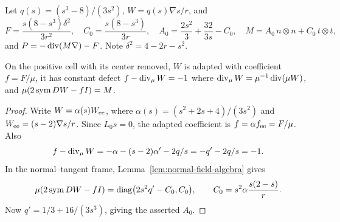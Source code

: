 \begin{definition}
\label{def:dd-virial-field}
\leanok
Let $q(s)=(s^3-8)/(3s^2)$, $W=q(s)\nabla s/r$, and
\[
  F=\frac{s(8-s^3)\delta^2}{3r^2},\quad
  C_0=\frac{s(8-s^3)}{3r},\quad
  A_0=\frac{2s^2}3+\frac{32}{3s}-C_0,\quad
  M=A_0\,n\otimes n+C_0\,t\otimes t,
\]
and $P=-\operatorname{div}(M\nabla)-F$. Note $\delta^2=4-2r-s^2$.
\end{definition}

\begin{lemma}
\label{lem:dd-virial-algebra}
\leanok
On the positive cell with its center removed, $W$ is adapted with coefficient $f=F/\mu$, it has constant defect
$f-\operatorname{div}_\mu W=-1$ where $\operatorname{div}_\mu W=\mu^{-1}\operatorname{div}(\mu W)$, and
$\mu(2\operatorname{sym} DW-fI)=M$.
\end{lemma}

\begin{proof}
\leanok
Write $W=\alpha(s)W_{\rm ee}$, where
$\alpha(s)=(s^2+2s+4)/(3s^2)$ and
$W_{\rm ee}=(s-2)\nabla s/r$. Since $L_0s=0$, the adapted coefficient is
$f=\alpha f_{\rm ee}=F/\mu$. Also
\[
 f-\operatorname{div}_\mu W=-\alpha-(s-2)\alpha'-2q/s=-q'-2q/s=-1.
\]
In the normal--tangent frame, Lemma~\ref{lem:normal-field-algebra} gives
\[
 \mu(2\operatorname{sym} DW-fI)
 =\operatorname{diag}\bigl(2s^2q'-C_0,C_0\bigr),\qquad
 C_0=s^2\alpha\frac{s(2-s)}r.
\]
Now $q'=1/3+16/(3s^3)$, giving the asserted $A_0$.
\end{proof}

